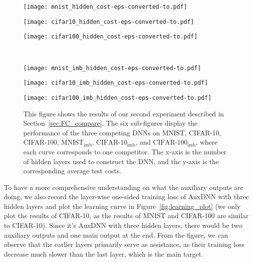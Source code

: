 \documentclass[a4paper]{article}
\begin{document}
  \begin{figure*}[!ht]
    \hspace{-0.8cm}
    \centering
    \begin{minipage}[b]{.3\textwidth}
      \texttt{[image: mnist\_hidden\_cost-eps-converted-to.pdf]}
    \end{minipage}\qquad
    \begin{minipage}[b]{.3\textwidth}
      \texttt{[image: cifar10\_hidden\_cost-eps-converted-to.pdf]}
    \end{minipage}\qquad
    \begin{minipage}[b]{.3\textwidth}
      \texttt{[image: cifar100\_hidden\_cost-eps-converted-to.pdf]}
    \end{minipage}\qquad \\
    \hspace{-0.8cm}
    \begin{minipage}[b]{.3\textwidth}
      \texttt{[image: mnist\_imb\_hidden\_cost-eps-converted-to.pdf]}
    \end{minipage}\qquad
    \begin{minipage}[b]{.3\textwidth}
      \texttt{[image: cifar10\_imb\_hidden\_cost-eps-converted-to.pdf]}
    \end{minipage}\qquad
    \begin{minipage}[b]{.3\textwidth}
      \texttt{[image: cifar100\_imb\_hidden\_cost-eps-converted-to.pdf]}
    \end{minipage}\qquad
    \caption{
      This figure shows the results of our second experiment described in Section~\ref{sec:FC_compare}.
      The six sub-figures display the performance of the three competing DNNs on MNIST, CIFAR-10, CIFAR-100, $\mathrm{MNIST}_{\mathrm{imb}}$, $\mathrm{CIFAR}$-$\mathrm{10}_{\mathrm{imb}}$, and $\mathrm{CIFAR}$-$\mathrm{100}_{\mathrm{imb}}$, where each curve corresponds to one competitor.
      The x-axis is the number of hidden layers used to construct the DNN, and the y-axis is the corresponding average test costs.
    }
    \label{fig:hidden_plot}
  \end{figure*}

  To have a more comprehensive understanding on what the auxiliary outputs are doing, we also record the layer-wise one-sided training loss of AuxDNN with three hidden layers and plot the learning curve in Figure~\ref{fig:learning_plot} (we only plot the results of CIFAR-10, as the results of MNIST and CIFAR-100 are similar to CIFAR-10).
  Since it's AuxDNN with three hidden layers, there would be two auxiliary outputs and one main output at the end.
  From the figure, we can observe that the earlier layers primarily serve as assistance, as their training loss decrease much slower than the last layer, which is the main target.
\end{document}
